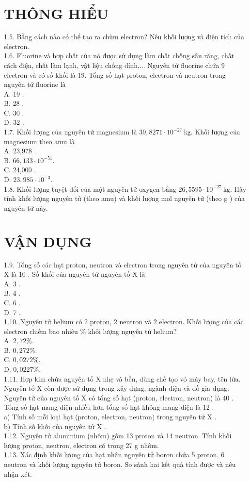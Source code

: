 \documentclass[10pt]{article}
\begin{document}
\section*{THÔNG HIỂU}
1.5. Bằng cách nào có thể tạo ra chùm electron? Nêu khối lượng và điện tích của electron.\\
1.6. Fluorine và hợp chất của nó được sử dụng làm chất chống sâu răng, chất cách điện, chất làm lạnh, vật liệu chống dính,... Nguyên tử fluorine chứa 9 electron và có số khối là 19. Tổng số hạt proton, electron và neutron trong nguyên tử fluorine là\\
A. 19 .\\
B. 28 .\\
C. 30 .\\
D. 32 .\\
1.7. Khối lượng của nguyên tử magnesium là $39,8271 \cdot 10^{-27} \mathrm{~kg}$. Khối lượng của magnesium theo amu là\\
A. 23,978 .\\
B. $66,133 \cdot 10^{-51}$.\\
C. 24,000 .\\
D. $23,985 \cdot 10^{-3}$.\\
1.8. Khối lượng tuyệt đối của một nguyên tử oxygen bằng $26,5595 \cdot 10^{-27} \mathrm{~kg}$. Hãy tính khối lượng nguyên tử (theo amu) và khối lượng mol nguyên tử (theo g ) của nguyên tử này.

\section*{VẬN DỤNG}
1.9. Tổng số các hạt proton, neutron và electron trong nguyên tử của nguyên tố X là 10 . Số khối của nguyên tử nguyên tố X là\\
A. 3 .\\
B. 4 .\\
C. 6 .\\
D. 7 .\\
1.10. Nguyên tử helium có 2 proton, 2 neutron và 2 electron. Khối lượng của các electron chiếm bao nhiêu \% khôi lượng nguyên tử helium?\\
A. $2,72 \%$.\\
B. $0,272 \%$.\\
C. $0,0272 \%$.\\
D. $0,0227 \%$.\\
1.11. Hợp kim chứa nguyên tố X nhẹ và bền, dùng chế tạo vỏ máy bay, tên lửa. Nguyên tố X còn được sử dụng trong xây dựng, ngành điện và đồ gia dụng. Nguyên tử của nguyên tố X có tổng số hạt (proton, electron, neutron) là 40 . Tổng số hạt mang điện nhiều hơn tổng số hạt không mang điện là 12 .\\
a) Tính số mỗi loại hạt (proton, electron, neutron) trong nguyên tử X .\\
b) Tính số khối của nguyên tử X .\\
1.12. Nguyên tử aluminium (nhôm) gồm 13 proton và 14 neutron. Tính khối lượng proton, neutron, electron có trong 27 g nhôm.\\
1.13. Xác định khối lượng của hạt nhân nguyên tử boron chứa 5 proton, 6 neutron và khối lượng nguyên tử boron. So sánh hai kết quả tính được và nêu nhận xét.
\end{document}
